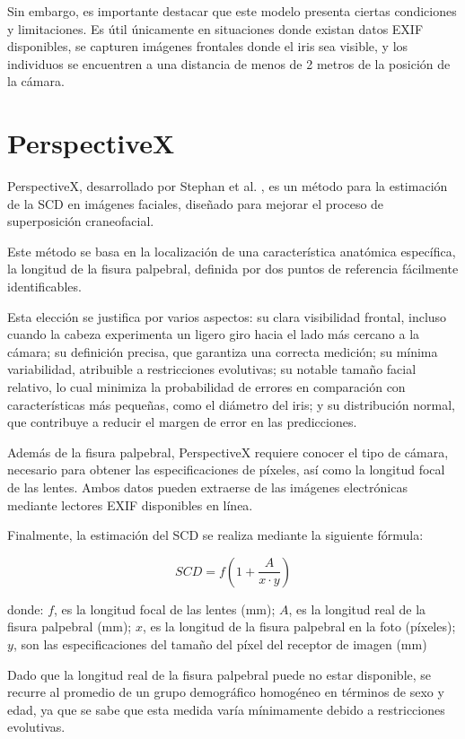 Sin embargo, es importante destacar que este modelo presenta ciertas condiciones y limitaciones. Es útil únicamente en situaciones donde existan datos EXIF disponibles, se capturen imágenes frontales donde el iris sea visible, y los individuos se encuentren a una distancia de menos de 2 metros de la posición de la cámara.

\section{PerspectiveX}

PerspectiveX, desarrollado por Stephan et al. \cite{55}, es un método para la estimación de la SCD en imágenes faciales, diseñado para mejorar el proceso de superposición craneofacial.

Este método se basa en la localización de una característica anatómica específica, la longitud de la fisura palpebral, definida por dos puntos de referencia fácilmente identificables. 

Esta elección se justifica por varios aspectos: su clara visibilidad frontal, incluso cuando la cabeza experimenta un ligero giro hacia el lado más cercano a la cámara; su definición precisa, que garantiza una correcta medición; su mínima variabilidad, atribuible a restricciones evolutivas; su notable tamaño facial relativo, lo cual minimiza la probabilidad de errores en comparación con características más pequeñas, como el diámetro del iris; y su distribución normal, que contribuye a reducir el margen de error en las predicciones.

Además de la fisura palpebral, PerspectiveX requiere conocer el tipo de cámara, necesario para obtener las especificaciones de píxeles, así como la longitud focal de las lentes. Ambos datos pueden extraerse de las imágenes electrónicas mediante lectores EXIF disponibles en línea.

Finalmente, la estimación del SCD se realiza mediante la siguiente fórmula:

\begin{equation}
	SCD = f (1+\frac{A}{x \cdot y})
\end{equation}

donde: $f$, es la longitud focal de las lentes (mm); $A$, es la longitud real de la fisura palpebral (mm); $x$, es la longitud de la fisura palpebral en la foto (píxeles); $y$, son las especificaciones del tamaño del píxel del receptor de imagen (mm)

Dado que la longitud real de la fisura palpebral puede no estar disponible, se recurre al promedio de un grupo demográfico homogéneo en términos de sexo y edad, ya que se sabe que esta medida varía mínimamente debido a restricciones evolutivas.

